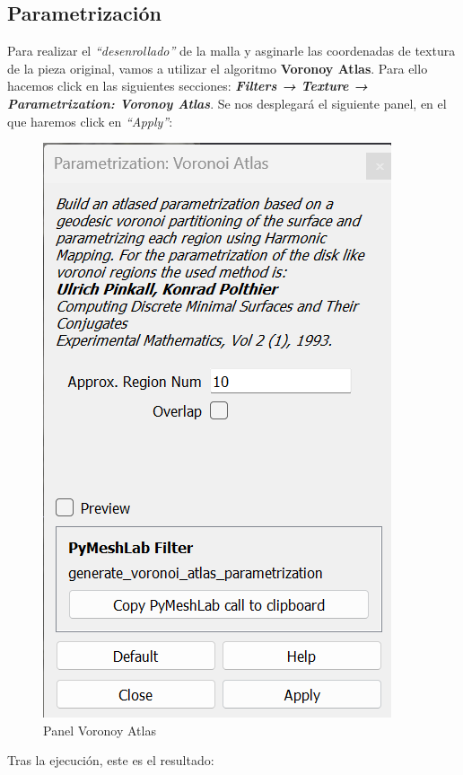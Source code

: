 \documentclass[options]{article}
\begin{document}
\subsection{Parametrización}

Para realizar el \textit{``desenrollado''} de la malla y asginarle las coordenadas de textura de la pieza original, vamos a utilizar el algoritmo \textbf{Voronoy Atlas}. Para ello hacemos click en las siguientes secciones: \textbf{\textit{Filters → Texture → Parametrization: Voronoy Atlas}}. Se nos desplegará el siguiente panel, en el que haremos click en \textit{``Apply''}:

\begin{figure}[H]
    \centering
    \includegraphics[scale=0.65]{images/parametrizacion_01.png}
    \caption{Panel Voronoy Atlas}
\end{figure}

\pagebreak
Tras la ejecución, este es el resultado:
\end{document}

